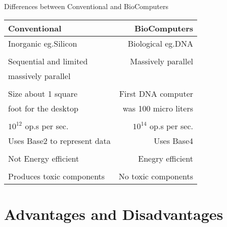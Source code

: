 \documentclass[10pt]{beamer}
\begin{document}
\begin{frame}{Differences between Conventional and BioComputers}
  \begin{table}
    \begin{tabular}{lr}
      \toprule
      Conventional & BioComputers \\
      \midrule
      Inorganic eg.Silicon & Biological eg.DNA \\ \\
      Sequential and limited &  Massively parallel\\
      massively parallel & \\ \\
      Size about 1 square  &  First DNA computer\\
      foot for the desktop & was 100 micro liters\\ \\
      $10^{12}$ op.s per sec. & $10^{14}$ op.s per sec.\\
    Uses Base2 to represent data & Uses Base4 \\ \\
      Not Energy efficient & Enegry efficient \\ \\
      Produces toxic components & No toxic components\\ 
      \bottomrule
    \end{tabular}
  \end{table}
\end{frame}

\section{Advantages and Disadvantages}
\end{document}
